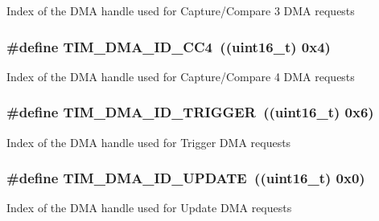 Index of the D\-M\-A handle used for Capture/\-Compare 3 D\-M\-A requests \hypertarget{group___t_i_m___d_m_a___handle__index_ga1860c00b370435ff40d9e65f14a61706}{
\subsubsection[{T\-I\-M\-\_\-\-D\-M\-A\-\_\-\-I\-D\-\_\-\-C\-C4}]{\setlength{\rightskip}{0pt plus 5cm}\#define T\-I\-M\-\_\-\-D\-M\-A\-\_\-\-I\-D\-\_\-\-C\-C4~((uint16\-\_\-t) 0x4)}}\label{group___t_i_m___d_m_a___handle__index_ga1860c00b370435ff40d9e65f14a61706}
Index of the D\-M\-A handle used for Capture/\-Compare 4 D\-M\-A requests \hypertarget{group___t_i_m___d_m_a___handle__index_ga39900e5227e4d813a726a1df5d86671c}{
\subsubsection[{T\-I\-M\-\_\-\-D\-M\-A\-\_\-\-I\-D\-\_\-\-T\-R\-I\-G\-G\-E\-R}]{\setlength{\rightskip}{0pt plus 5cm}\#define T\-I\-M\-\_\-\-D\-M\-A\-\_\-\-I\-D\-\_\-\-T\-R\-I\-G\-G\-E\-R~((uint16\-\_\-t) 0x6)}}\label{group___t_i_m___d_m_a___handle__index_ga39900e5227e4d813a726a1df5d86671c}
Index of the D\-M\-A handle used for Trigger D\-M\-A requests \hypertarget{group___t_i_m___d_m_a___handle__index_ga15f38cee11f8b2b5a85cbf4552ba140d}{
\subsubsection[{T\-I\-M\-\_\-\-D\-M\-A\-\_\-\-I\-D\-\_\-\-U\-P\-D\-A\-T\-E}]{\setlength{\rightskip}{0pt plus 5cm}\#define T\-I\-M\-\_\-\-D\-M\-A\-\_\-\-I\-D\-\_\-\-U\-P\-D\-A\-T\-E~((uint16\-\_\-t) 0x0)}}\label{group___t_i_m___d_m_a___handle__index_ga15f38cee11f8b2b5a85cbf4552ba140d}
Index of the D\-M\-A handle used for Update D\-M\-A requests 